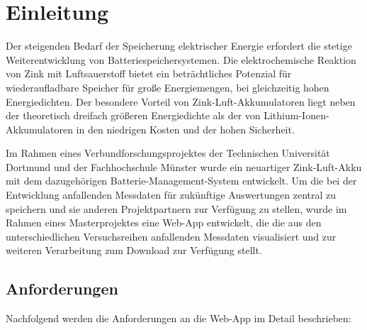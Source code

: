 \chapter{Einleitung}\label{ch:einleitung}


Der steigenden Bedarf der Speicherung elektrischer Energie erfordert die stetige Weiterentwicklung von Batteriespeichersystemen. Die elektrochemische Reaktion von Zink mit Luftsauerstoff bietet ein beträchtliches Potenzial für wiederaufladbare Speicher für große Energiemengen, bei gleichzeitig hohen Energiedichten. Der besondere Vorteil von Zink-Luft-Akkumulatoren liegt neben der theoretisch dreifach größeren Energiedichte als der von Lithium-Ionen-Akkumulatoren in den niedrigen Kosten und der hohen Sicherheit.

Im Rahmen eines Verbundforschungsprojektes der Technischen Universität Dortmund und der Fachhochschule Münster wurde ein neuartiger Zink-Luft-Akku mit dem dazugehörigen Batterie-Management-System entwickelt. Um die bei der Entwicklung anfallenden Messdaten für zukünftige Auswertungen zentral zu speichern und sie anderen Projektpartnern zur Verfügung zu stellen, wurde im Rahmen eines Masterprojektes eine Web-App entwickelt, die die aus den unterschiedlichen Versuchsreihen anfallenden Messdaten visualisiert und zur weiteren Verarbeitung zum Download zur Verfügung stellt.

\section{Anforderungen}

Nachfolgend werden die Anforderungen an die Web-App im Detail beschrieben:

